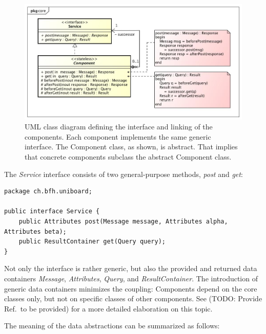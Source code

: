 \documentclass[oneside]{scrreprt}
\begin{document}
\begin{figure}[ht]
\centerline{
\includegraphics[width=1.0\textwidth]{figs/chain-of-components}}
\caption{UML class diagram defining the interface and linking
of the components. Each component implements the same generic
interface. The Component class, as shown, is abstract. That
implies that concrete components subclass the abstract
Component class.}
\label{fig:chain-of-components}
\end{figure}

The \emph{Service} interface consists of two
general-purpose methods, \emph{post} and \emph{get}:

\begin{lstlisting}[style=javastyle]
package ch.bfh.uniboard;

public interface Service {
    public Attributes post(Message message, Attributes alpha, Attributes beta);
    public ResultContainer get(Query query);
}
\end{lstlisting}

Not only the interface is rather generic, but also the provided
and returned data containers \emph{Message}, \emph{Attributes},
\emph{Query}, and \emph{ResultContainer}. The introduction of generic
data containers minimizes the coupling: Components depend on
the core classes only, but not on specific classes of other
components. See (TODO: Provide Ref.\ to be provided) for
a more detailed elaboration on this topic.

The meaning of the data abstractions can be summarized as follows:
\end{document}
